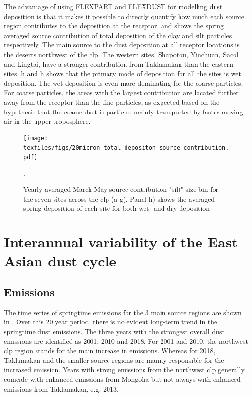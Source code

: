The advantage of using FLEXPART and FLEXDUST for modelling dust deposition is that it makes it possible to directly quantify how much each source region contributes to the deposition at the receptor.   
 and  shows the spring averaged source contribution of total deposition of the clay and silt particles respectively. 
The main source to the dust deposition at all receptor locations is the  deserts northwest of the \acrshort{clp}. 
The western sites, Shapotou, Yinchuan, Sacol and Lingtai, have a stronger contribution from Taklamakan than the eastern sites. 
h and h shows that the primary mode of deposition for all the sites is wet deposition.
The wet deposition is even more dominating for the coarse particles. 
For coarse particles, the areas with the largest contribution are located further away from the receptor than the fine particles, as expected based on the hypothesis that the coarse dust is particles mainly transported by faster-moving air in the upper troposphere.
    
 \begin{figure}[htbp]
    \centering
    \texttt{[image: texfiles/figs/20micron\_total\_depositon\_source\_contribution.pdf]}
    \caption{Yearly averaged March-May source contribution "silt" size bin for the seven sites across the \acrshort{clp} (a-g). Panel h) shows the averaged spring deposition of each site for both wet- and dry deposition}.
    \label{fig:source_contrib_20mmu}
\end{figure}

\section{Interannual variability of the East Asian dust cycle}\label{sec:inter_annual_results}

\subsection{Emissions}
The time series of springtime emissions for the 3 main source regions are shown in . Over this 20 year period, there is no evident long-term trend in the springtime dust emissions. 
The three years with the strongest overall dust emissions are identified as 2001, 2010 and 2018. For 2001 and 2010, the northwest \acrshort{clp} region stands for the main increase in emissions.
Whereas for 2018, Taklamakan and the smaller source regions are mainly responsible for the increased emission.
Years with strong emissions from the northwest \acrshort{clp} generally coincide with enhanced emissions from Mongolia but not always with enhanced emissions from Taklamakan, e.g. 2013.   

